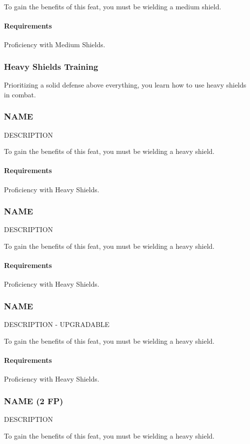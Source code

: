     To gain the benefits of this feat, you must be wielding a medium shield.
    \paragraph{Requirements} Proficiency with Medium Shields.
\subsubsection{Heavy Shields Training} \label{feat::heavyshieldtraining}
    Prioritizing a solid defense above everything, you learn how to use heavy shields in combat.
\subsubsection{NAME} \label{feat::name}
    DESCRIPTION

    To gain the benefits of this feat, you must be wielding a heavy shield.
    \paragraph{Requirements} Proficiency with Heavy Shields.
\subsubsection{NAME} \label{feat::name}
    DESCRIPTION

    To gain the benefits of this feat, you must be wielding a heavy shield.
    \paragraph{Requirements} Proficiency with Heavy Shields.
\subsubsection{NAME} \label{feat::name}
    DESCRIPTION - UPGRADABLE

    To gain the benefits of this feat, you must be wielding a heavy shield.
    \paragraph{Requirements} Proficiency with Heavy Shields.
\subsubsection{NAME (2 FP)} \label{feat::name}
    DESCRIPTION

    To gain the benefits of this feat, you must be wielding a heavy shield.
